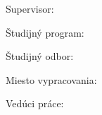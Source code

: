 




Supervisor: \mySupervisor

\medskip{}
\myDateENG


\newpage
\thispagestyle{empty}
\mbox{}
\newpage





Študijný program: \myStudyProgram

Študijný odbor: \myDegreeCourse

Miesto vypracovania: \myInstitute

Vedúci práce: \mySupervisor

\medskip{}

\myDate


\newpage
\thispagestyle{empty}
\mbox{}
\newpage

